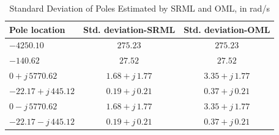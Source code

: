 \begin{table}
    \centering
    \caption{Standard Deviation of Poles Estimated by SRML and OML, in rad/s}
    \label{tab:ML_pole_stddev}
    \begin{tabular}{l c c}
    \hline
    \textbf{Pole location} & \textbf{Std. deviation-SRML} & \textbf{Std. deviation-OML} \\
    \hline
    $-4250.10$ 
        & $275.23$ 
        & $275.23$ \\
    $-140.62$ 
        & $27.52$ 
        & $27.52$ \\
    $0 + j\,5770.62$ 
        & $1.68 + j\,1.77$ 
        & $3.35 + j\,1.77$ \\
    $-22.17 + j\,445.12$ 
        & $0.19 + j\,0.21$ 
        & $0.37 + j\,0.21$ \\
    $0 - j\,5770.62$ 
        & $1.68 + j\,1.77$ 
        & $3.35 + j\,1.77$ \\
    $-22.17 - j\,445.12$ 
        & $0.19 + j\,0.21$ 
        & $0.37 + j\,0.21$ \\
    \hline
    \end{tabular}
\end{table}



